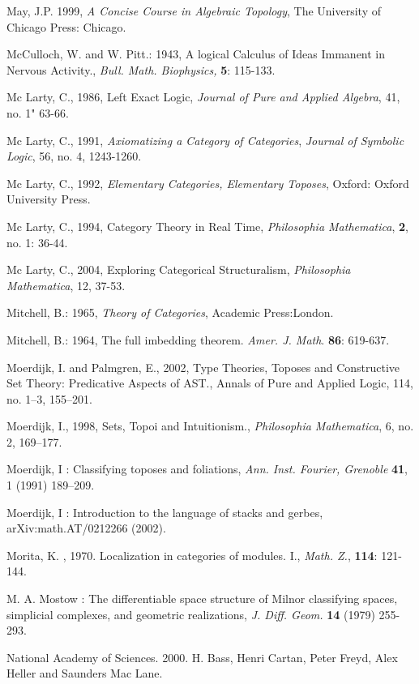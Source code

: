 \documentclass[12pt]{article}
\theoremstyle{plain}
\theoremstyle{definition}
\numberwithin{equation}{section}
\begin{document}
\begin{thebibliography}{9}
May, J.P. 1999, \emph{A Concise Course in Algebraic Topology}, The University of Chicago Press: Chicago.

McCulloch, W. and W. Pitt.: 1943, A logical Calculus of Ideas Immanent in Nervous Activity., \emph{Bull. Math. Biophysics,} \textbf{5}: 115-133.

Mc Larty, C., 1986, Left Exact Logic, {\em Journal of Pure and Applied Algebra}, {41}, no. 1" 63-66.

Mc Larty, C., 1991, {\em Axiomatizing a Category of Categories}, {\em Journal of Symbolic Logic}, 56, no. 4, 1243-1260. 

Mc Larty, C., 1992, {\em Elementary Categories, Elementary Toposes}, Oxford: Oxford University Press.

Mc Larty, C., 1994, Category Theory in Real Time, {\em Philosophia Mathematica}, \textbf{2}, no. 1: 36-44.

Mc Larty, C., 2004, Exploring Categorical Structuralism, {\em Philosophia Mathematica}, 12, 37-53.

Mitchell, B.: 1965, \emph{Theory of Categories}, Academic Press:London.

Mitchell, B.: 1964, The full imbedding theorem. \emph{Amer. J. Math}. \textbf{86}: 619-637.

Moerdijk, I. and Palmgren, E., 2002, Type Theories, Toposes and Constructive Set Theory: Predicative Aspects of AST., Annals of Pure and Applied Logic, 114, no. 1--3, 155--201. 

Moerdijk, I., 1998, Sets, Topoi and Intuitionism., {\em Philosophia Mathematica}, 6, no. 2, 169--177.

Moerdijk, I : Classifying toposes and foliations, {\it Ann. Inst. Fourier, Grenoble} \textbf{41}, 1 (1991) 189--209.

Moerdijk, I : Introduction to the language of stacks and gerbes, arXiv:math.AT/0212266 (2002).

Morita, K. , 1970. Localization in categories of modules. I., {\em Math. Z.}, 
\textbf{114}: 121-144.

M. A. Mostow : The differentiable space structure of Milnor classifying spaces, 
simplicial complexes, and geometric realizations, \emph{J. Diff. Geom.} \textbf{14} (1979) 255-293.


National Academy of Sciences. 2000. H. Bass, Henri Cartan, Peter Freyd, Alex Heller and Saunders Mac Lane.   


\end{thebibliography}
\end{document}
